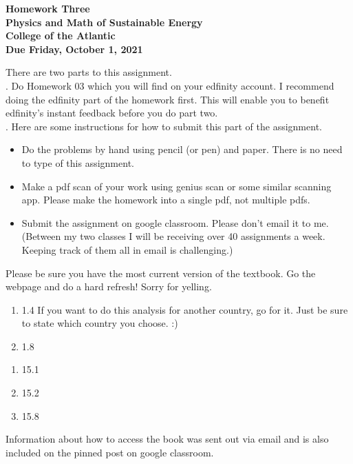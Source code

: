 \documentclass[12pt]{article}
\begin{document}
\pagestyle{empty}
 
\begin{center}
{\LARGE {\bf Homework Three}}\\
\bigskip
{\Large {\bf Physics and Math of Sustainable Energy}}\\
\bigskip
{\Large {\bf College of the Atlantic}}\\
\bigskip
{ {\bf Due Friday, October 1, 2021}}\\ 
\end{center}
\medskip


\noindent There are two parts to this assignment.\\

.  Do Homework 03 which you will find
on your edfinity account.  I recommend doing the edfinity part of the
homework first.  This will enable you to benefit edfinity's instant
feedback before you do part two.\\


.  Here are some
instructions for how to submit this part of the assignment.
\begin{itemize}
\item Do the problems by hand using pencil (or pen) and paper.
  There is no need to type of this assignment.
\item Make a pdf scan of your work using genius scan or some
  similar scanning app.  Please make the homework into a single
  pdf, not multiple pdfs.
\item Submit the assignment on google classroom.  Please don't
  email it to me.  (Between my two classes I will be receiving
  over 40 assignments a week.  Keeping track of them all in email
  is challenging.)\\
\end{itemize}


  Please be sure you have the most
current version of the textbook.  Go the webpage and do a hard
refresh!  Sorry for yelling.\\ 

\begin{enumerate}
\setlength{\itemsep}{-1mm}
\item 1.4 If you want to do this analysis for another country, go for
  it.  Just be sure to state which country you choose.  :)
\item 1.8\\
\end{enumerate}

\begin{enumerate}
\setlength{\itemsep}{-1mm}
\item 15.1
\item 15.2
\item 15.8\\
\end{enumerate}

\noindent Information about how to access the book was sent out
via email and is also included on the pinned post on google
classroom. 
\end{document}
